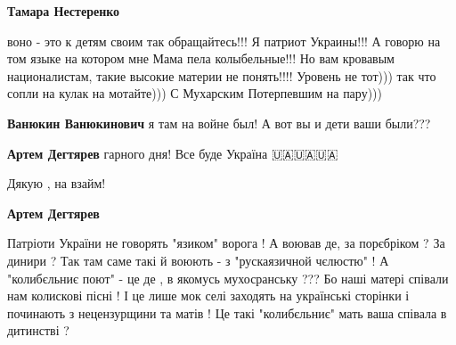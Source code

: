 \begin{itemize}
\begin{itemize}
\begin{itemize}
 
\textbf{Тамара Нестеренко} 

воно - это к детям своим так обращайтесь!!! Я патриот Украины!!! А говорю на
том языке на котором мне Мама пела колыбельные!!! Но вам кровавым
националистам, такие высокие материи не понять!!!! Уровень не тот))) так что
сопли на кулак на мотайте))) С Мухарским Потерпевшим на пару)))


 
\textbf{Ванюкин Ванюкинович} я там на войне был! А вот вы и дети ваши были???

 
\textbf{Артем Дегтярев} гарного дня! Все буде Україна 🇺🇦🇺🇦🇺🇦

 
Дякую , на взайм!

 
\textbf{Артем Дегтярев} 

Патріоти України не говорять "язиком" ворога ! А воював де, за порєбріком ? За
динири ? Так там саме такі й воюють - з "рускаязичной чєлюстю" ! А "колибєльниє
поют" - це де , в якомусь мухосранську ??? Бо наші матері співали нам колискові
пісні ! І це лише мок селі заходять на українські сторінки і починають з
нецензурщини та матів ! Це такі "колибєльниє" мать ваша співала в дитинстві ? 


\end{itemize}
\end{itemize}
\end{itemize}
